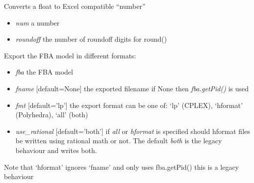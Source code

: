 \documentclass[a4paper,11pt,english]{sphinxmanual}
\begin{document}

\begin{fulllineitems}
\label{modules_doc:cbmpy.CBWrite.convertFloatToExcel}
Converts a float to Excel compatible ``number''
\begin{itemize}
\item {} 
\emph{num} a number

\item {} 
\emph{roundoff} the number of roundoff digits for round()

\end{itemize}

\end{fulllineitems}


\begin{fulllineitems}
\label{modules_doc:cbmpy.CBWrite.exportModel}
Export the FBA model in different formats:
\begin{itemize}
\item {} 
\emph{fba} the FBA model

\item {} 
\emph{fname} {[}default=None{]} the exported filename if None then \emph{fba.getPid()} is used

\item {} 
\emph{fmt} {[}default='lp'{]} the export format can be one of: `lp' (CPLEX), `hformat' (Polyhedra), `all' (both)

\item {} 
\emph{use\_rational} {[}default='both'{]} if \emph{all} or \emph{hformat} is specified should hformat files be written using rational math or not. The default \emph{both} is the legacy behaviour and writes both.

\end{itemize}

Note that `hformat' ignores `fname' and only uses fba.getPid() this is a legacy behaviour

\end{fulllineitems}

\end{document}
